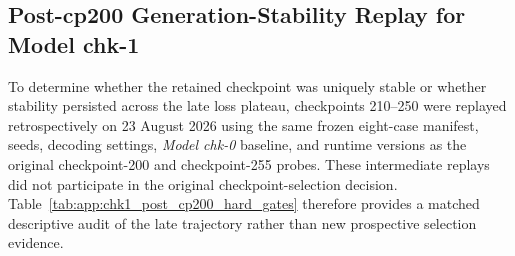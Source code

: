 \subsection*{Post-cp200 Generation-Stability Replay for Model chk-1}

To determine whether the retained checkpoint was uniquely stable or whether
stability persisted across the late loss plateau, checkpoints 210--250 were
replayed retrospectively on 23 August 2026 using the same frozen eight-case
manifest, seeds, decoding settings, \textit{Model chk-0} baseline, and runtime
versions as the original checkpoint-200 and checkpoint-255 probes. These
intermediate replays did not participate in the original checkpoint-selection
decision. Table~\ref{tab:app:chk1_post_cp200_hard_gates} therefore provides a
matched descriptive audit of the late trajectory rather than new prospective
selection evidence.

